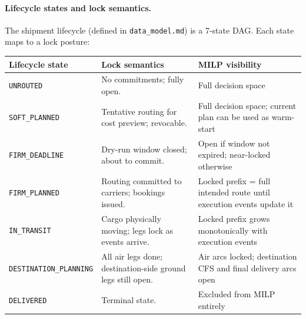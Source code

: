 \documentclass[11pt,a4paper]{article}
\theoremstyle{definition}
\begin{document}
\paragraph{Lifecycle states and lock semantics.}
The shipment lifecycle (defined in \texttt{data\_model.md}) is a 7-state DAG. Each
state maps to a lock posture:
\begin{center}
\begin{tabular}{lp{7.5cm}l}
\toprule
Lifecycle state & Lock semantics & MILP visibility \\
\midrule
\texttt{UNROUTED} & No commitments; fully open. & Full decision space \\
\texttt{SOFT\_PLANNED} & Tentative routing for cost preview; revocable. & Full decision space; current plan can be used as warm-start \\
\texttt{FIRM\_DEADLINE} & Dry-run window closed; about to commit. & Open if window not expired; near-locked otherwise \\
\texttt{FIRM\_PLANNED} & Routing committed to carriers; bookings issued. & Locked prefix = full intended route until execution events update it \\
\texttt{IN\_TRANSIT} & Cargo physically moving; legs lock as events arrive. & Locked prefix grows monotonically with execution events \\
\texttt{DESTINATION\_PLANNING} & All air legs done; destination-side ground legs still open. & Air arcs locked; destination CFS and final delivery arcs open \\
\texttt{DELIVERED} & Terminal state. & Excluded from MILP entirely \\
\bottomrule
\end{tabular}
\end{center}
\end{document}
